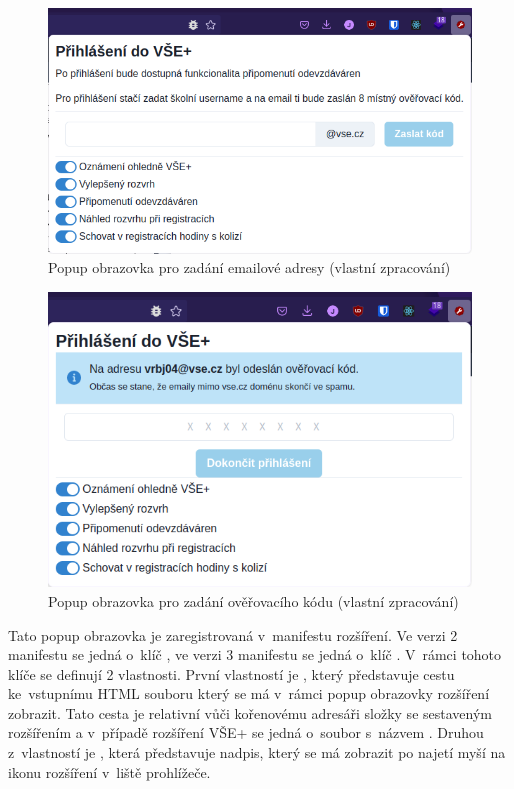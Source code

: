 \begin{figure}[H]\centering
    \includegraphics[width=\textwidth]{img/prihlaseni-vse-plus.png}
    \caption{Popup obrazovka pro zadání emailové adresy (vlastní zpracování)}
    \label{fig:prihlaseni-1}
\end{figure}


\begin{figure}[H]\centering
    \includegraphics[width=\textwidth]{img/prihlaseni-vse-plus-kod.png}
    \caption{Popup obrazovka pro zadání ověřovacího kódu (vlastní zpracování)}
    \label{fig:prihlaseni-2}
\end{figure}

Tato popup obrazovka je zaregistrovaná v~manifestu rozšíření. Ve verzi 2 manifestu se jedná o~klíč , ve verzi 3 manifestu se jedná o~klíč . V~rámci tohoto klíče se definují 2 vlastnosti. První vlastností je , který představuje cestu ke~vstupnímu HTML souboru který se má v~rámci popup obrazovky rozšíření zobrazit. Tato cesta je relativní vůči kořenovému adresáři složky se sestaveným rozšířením a v~případě rozšíření VŠE+ se jedná o~soubor s~názvem . Druhou z~vlastností je , která představuje nadpis, který se má zobrazit po najetí myší na ikonu rozšíření v~liště prohlížeče.


